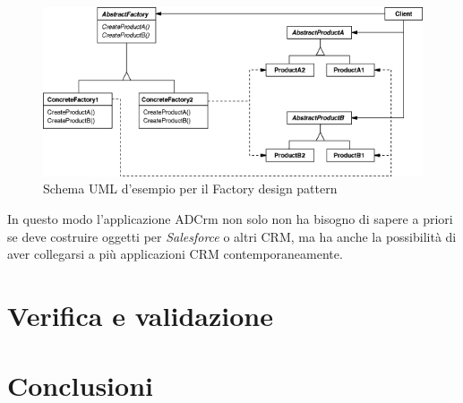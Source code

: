\documentclass[12pt,a4paper,twoside,openright,english]{book}
\begin{document}
\begin{figure}[H]
	\centering
	\includegraphics[width=\linewidth]{images/abstract_factory_structure}
	\caption{Schema UML d'esempio per il Factory design pattern}
	\label{fig:abstractfactorystructure}
\end{figure}

In questo modo l'applicazione ADCrm non solo non ha bisogno di sapere a priori se deve costruire oggetti per \textit{Salesforce} o altri CRM, ma ha anche la possibilità di aver collegarsi a più applicazioni CRM contemporaneamente.





\chapter{Verifica e validazione}\label{verifica_validazione}

\chapter{Conclusioni}\label{conclusioni}

\printglossaries

%




\end{document}
